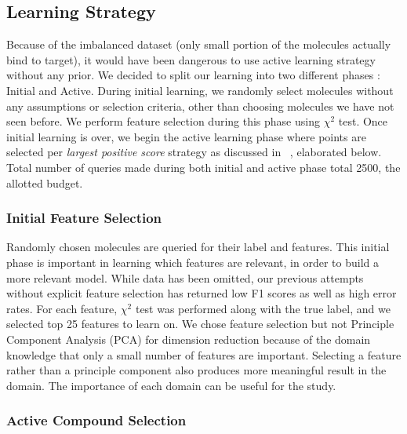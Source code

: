 \documentclass[paper=a4, fontsize=11pt]{scrartcl}
\numberwithin{equation}{section}    %
\numberwithin{figure}{section}      %
\numberwithin{table}{section}       %
\numberwithin{equation}{section}    %
\numberwithin{figure}{section}      %
\numberwithin{table}{section}       %
\begin{document}
\subsection{Learning Strategy}

Because of the imbalanced dataset (only small portion of the molecules actually bind to target), it would have been dangerous to use active learning strategy without any prior. We decided to split our learning into two different phases : Initial and Active. During initial learning, we randomly select molecules without any assumptions or selection criteria, other than choosing molecules we have not seen before. We perform feature selection during this phase using $\chi^2$ test. Once initial learning is over, we begin the active learning phase where points are selected per \textit{largest positive score} strategy as discussed in ~\cite{ref:warmuth}, elaborated below. Total number of queries made during both initial and active phase total 2500, the allotted budget. 


\subsubsection{Initial Feature Selection}

Randomly chosen molecules are queried for their label and features. This initial phase is important in learning which features are relevant, in order to build a more relevant model. While data has been omitted, our previous attempts without explicit feature selection has returned low F1 scores as well as high error rates. For each feature, $\chi^2$ test was performed along with the true label, and we selected top 25 features to learn on. We chose feature selection but not Principle Component Analysis (PCA) for dimension reduction because of the domain knowledge that only a small number of features are important. Selecting a feature rather than a principle component also produces more meaningful result in the domain. The importance of each domain can be useful for the study.

\subsubsection{Active Compound Selection}
\end{document}
